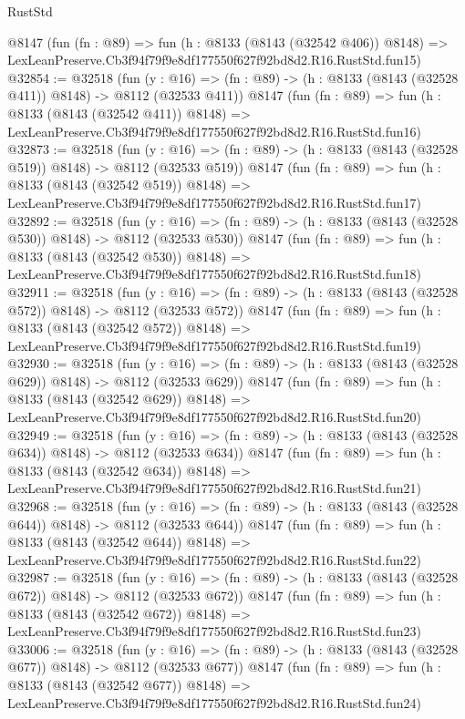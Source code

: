 \begin{lexlean}{RustStd}
\begin{coremodule}
    @8147
    (fun (fn : @89) =>
    fun (h : @8133 (@8143 (@32542 @406)) @8148) =>
    LexLeanPreserve.Cb3f94f79f9e8df177550f627f92bd8d2.R16.RustStd.fun15)
@32854 := @32518
    (fun (y : @16) => (fn : @89) -> (h : @8133 (@8143 (@32528 @411)) @8148) -> @8112 (@32533 @411))
    @8147
    (fun (fn : @89) =>
    fun (h : @8133 (@8143 (@32542 @411)) @8148) =>
    LexLeanPreserve.Cb3f94f79f9e8df177550f627f92bd8d2.R16.RustStd.fun16)
@32873 := @32518
    (fun (y : @16) => (fn : @89) -> (h : @8133 (@8143 (@32528 @519)) @8148) -> @8112 (@32533 @519))
    @8147
    (fun (fn : @89) =>
    fun (h : @8133 (@8143 (@32542 @519)) @8148) =>
    LexLeanPreserve.Cb3f94f79f9e8df177550f627f92bd8d2.R16.RustStd.fun17)
@32892 := @32518
    (fun (y : @16) => (fn : @89) -> (h : @8133 (@8143 (@32528 @530)) @8148) -> @8112 (@32533 @530))
    @8147
    (fun (fn : @89) =>
    fun (h : @8133 (@8143 (@32542 @530)) @8148) =>
    LexLeanPreserve.Cb3f94f79f9e8df177550f627f92bd8d2.R16.RustStd.fun18)
@32911 := @32518
    (fun (y : @16) => (fn : @89) -> (h : @8133 (@8143 (@32528 @572)) @8148) -> @8112 (@32533 @572))
    @8147
    (fun (fn : @89) =>
    fun (h : @8133 (@8143 (@32542 @572)) @8148) =>
    LexLeanPreserve.Cb3f94f79f9e8df177550f627f92bd8d2.R16.RustStd.fun19)
@32930 := @32518
    (fun (y : @16) => (fn : @89) -> (h : @8133 (@8143 (@32528 @629)) @8148) -> @8112 (@32533 @629))
    @8147
    (fun (fn : @89) =>
    fun (h : @8133 (@8143 (@32542 @629)) @8148) =>
    LexLeanPreserve.Cb3f94f79f9e8df177550f627f92bd8d2.R16.RustStd.fun20)
@32949 := @32518
    (fun (y : @16) => (fn : @89) -> (h : @8133 (@8143 (@32528 @634)) @8148) -> @8112 (@32533 @634))
    @8147
    (fun (fn : @89) =>
    fun (h : @8133 (@8143 (@32542 @634)) @8148) =>
    LexLeanPreserve.Cb3f94f79f9e8df177550f627f92bd8d2.R16.RustStd.fun21)
@32968 := @32518
    (fun (y : @16) => (fn : @89) -> (h : @8133 (@8143 (@32528 @644)) @8148) -> @8112 (@32533 @644))
    @8147
    (fun (fn : @89) =>
    fun (h : @8133 (@8143 (@32542 @644)) @8148) =>
    LexLeanPreserve.Cb3f94f79f9e8df177550f627f92bd8d2.R16.RustStd.fun22)
@32987 := @32518
    (fun (y : @16) => (fn : @89) -> (h : @8133 (@8143 (@32528 @672)) @8148) -> @8112 (@32533 @672))
    @8147
    (fun (fn : @89) =>
    fun (h : @8133 (@8143 (@32542 @672)) @8148) =>
    LexLeanPreserve.Cb3f94f79f9e8df177550f627f92bd8d2.R16.RustStd.fun23)
@33006 := @32518
    (fun (y : @16) => (fn : @89) -> (h : @8133 (@8143 (@32528 @677)) @8148) -> @8112 (@32533 @677))
    @8147
    (fun (fn : @89) =>
    fun (h : @8133 (@8143 (@32542 @677)) @8148) =>
    LexLeanPreserve.Cb3f94f79f9e8df177550f627f92bd8d2.R16.RustStd.fun24)

\end{coremodule}
\end{lexlean}

